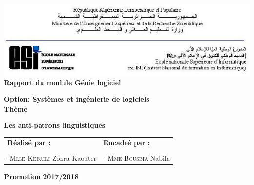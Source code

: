 
\begin{titlepage}
 \begin{center}
 \includegraphics[scale=0.9]{Others/Resources/entete.png}\\
 \vspace*{1cm}
  \LARGE
  \textbf{Rapport du module Génie logiciel\\}
  \large
 
  \LARGE
  	\vspace{2cm}
  \textbf{Option: Systèmes et ingénierie de logiciels}\\
  \vspace{1cm}
  \LARGE
  \textbf{Thème}\\
  \vspace{1cm}
  \LARGE
  \setlength{\fboxsep}{0.5cm}
  \begin{framed}
	\textbf{Les anti-patrons linguistiques}
  \end{framed}
  \vspace{2cm}
  \begin{table}[H]
   \setlength{\tabcolsep}{2cm}
    \large
	\centering
	\begin{tabular}{ll}
		\textbf{Réalisé par :}    
		 & \textbf{Encadré par : } \\  \\
		 -\textsc{Mlle Kebaili} Zohra Kaouter 
	
	& -\textsc{ Mme Bousbia} Nabila   \\
	

	\end{tabular}
  \end{table}
  \vspace{\fill}
  \large
  \textbf{Promotion 2017/2018}
        
 \end{center}
\end{titlepage}